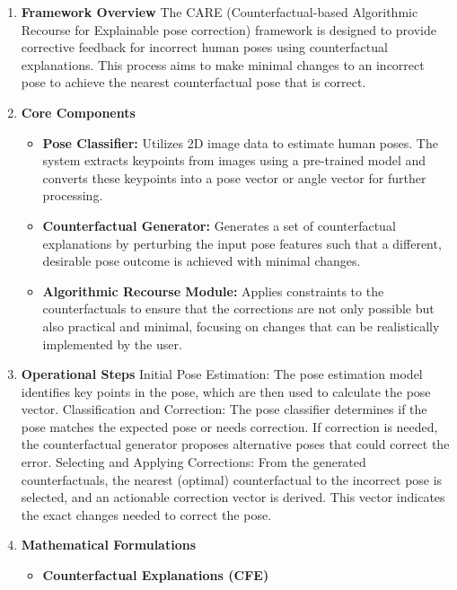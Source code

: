 \begin{enumerate}

\item \textbf{Framework Overview} \newline
The CARE (Counterfactual-based Algorithmic Recourse for Explainable pose correction) framework is designed to provide corrective feedback for incorrect human poses using counterfactual explanations. This process aims to make minimal changes to an incorrect pose to achieve the nearest counterfactual pose that is correct.
\item \textbf{Core Components}
\begin{itemize}
\item \textbf{Pose Classifier:} Utilizes 2D image data to estimate human poses. The system extracts keypoints from images using a pre-trained model and converts these keypoints into a pose vector or angle vector for further processing.
\item \textbf{Counterfactual Generator:} Generates a set of counterfactual explanations by perturbing the input pose features such that a different, desirable pose outcome is achieved with minimal changes.
\item \textbf{Algorithmic Recourse Module:} Applies constraints to the counterfactuals to ensure that the corrections are not only possible but also practical and minimal, focusing on changes that can be realistically implemented by the user.
\end{itemize}
\item \textbf{Operational Steps} \newline
Initial Pose Estimation: The pose estimation model identifies key points in the pose, which are then used to calculate the pose vector.
Classification and Correction: The pose classifier determines if the pose matches the expected pose or needs correction. If correction is needed, the counterfactual generator proposes alternative poses that could correct the error.
Selecting and Applying Corrections: From the generated counterfactuals, the nearest (optimal) counterfactual to the incorrect pose is selected, and an actionable correction vector is derived. This vector indicates the exact changes needed to correct the pose.
\item \textbf{Mathematical Formulations} \newline
\begin{itemize}
    \item \textbf{Counterfactual Explanations (CFE)} \newline

\end{itemize}
\end{enumerate}

